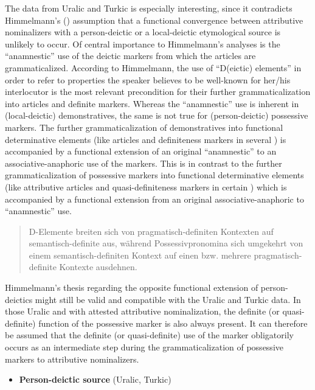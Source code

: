 {The data from Uralic and Turkic is especially interesting, since it contradicts Himmelmann's (\citeyear[220–221]{himmelmann1997}) assumption that a functional convergence between attributive nominalizers with a person-deictic or a local-deictic etymological source is unlikely to occur. Of central importance to Himmelmann's analyses is the “anamnestic” use of the deictic markers from which the articles are grammaticalized. According to Himmelmann, the use of “D(eictic) elements” in order to refer to properties the speaker believes to be well-known for her/his interlocutor is the most relevant precondition for their further grammaticalization into articles and definite markers. Whereas the “anamnestic” use is inherent in (local-deictic) demonstratives, the same is not true for (person-deictic) possessive markers. The further grammaticalization of demonstratives into functional determinative elements (like articles and definiteness markers in several ) is accompanied by a functional extension of an original “anamnestic” to an associative-anaphoric use of the markers. This is in contrast to the further grammaticalization of possessive markers into functional determinative elements (like attributive articles and quasi-definiteness markers in certain ) which is accompanied by a functional extension from an original associative-anaphoric to “anamnestic” use.
\begin{quote}
D-Elemente breiten sich von pragmatisch-definiten Kontexten auf semantisch-definite aus, während Possessivpronomina sich umgekehrt von einem semantisch-definiten Kontext auf einen bzw. mehrere pragmatisch-definite Kontexte ausdehnen. \citep[221]{himmelmann1997}
\end{quote}
Himmelmann's thesis regarding the opposite functional extension of person-deictics might still be valid and compatible with the Uralic and Turkic data. In those Uralic and  with attested attributive nominalization, the definite (or quasi-definite) function of the possessive marker is also always present. It can therefore be assumed that the definite (or quasi-definite) use of the marker obligatorily occurs as an intermediate step during the grammaticalization of possessive markers to attributive nominalizers.
\begin{itemize}
\item \textbf{Person-deictic source} (Uralic, Turkic)\\

\end{itemize}}

